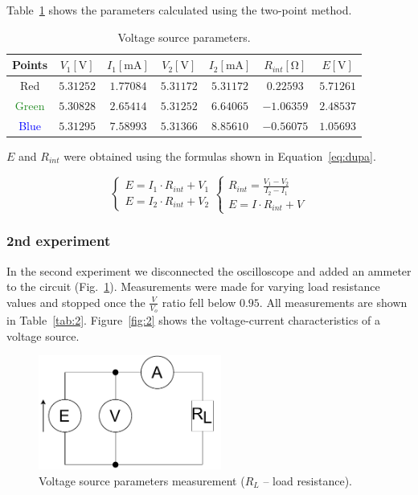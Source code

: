 Table~\ref{tab:voltage_2point} shows the parameters calculated using the two-point method.

\begin{table}[H]
	\centering
	\begin{tabular}{  c | c | c | c | c | c | c}
		Points & $V_1 [\unit{\volt}]$ & $I_1 [\unit{\milli\ampere}]$ & $V_2 [\unit{\volt}]$ & $I_2 [\unit{\milli\ampere}]$ & $R_{int} [\unit{\ohm}]$ & $E [\unit{\volt}]$ \\
		\hline
		\textcolor{BrickRed}{Red} & $5.31252$ & $1.77084$ & $5.31172$ & $5.31172$ & $0.22593$ & $5.71261$ \\
		\textcolor{ForestGreen}{Green} & $5.30828$ & $2.65414$ & $5.31252$ & $6.64065$ & $-1.06359$ & $2.48537$ \\
		\textcolor{blue}{Blue} & $5.31295$ & $7.58993$ & $5.31366$ & $8.85610$ & $-0.56075$ & $1.05693$ \\
	\end{tabular}
	\caption{Voltage source parameters.}
	\label{tab:voltage_2point}
\end{table}

$E$ and $R_{int}$ were obtained using the formulas shown in Equation~\ref{eq:dupa}.

\begin{equation}
	\begin{cases}
			E = I_1\cdot R_{int} + V_1\\
			E = I_2\cdot R_{int} + V_2
	\end{cases}
	\begin{cases}
		R_{int} = \frac{V_1-V_2}{I_2-I_1}\\
		E = I\cdot R_{int} + V
	\end{cases}
	\label{eq:dupa}
\end{equation}


\subsubsection*{2nd experiment}

In the second experiment we disconnected the oscilloscope and added an ammeter to the circuit (Fig.~\ref{fig:voltage}). Measurements were made for varying load resistance values and stopped once the $\frac{V}{V_o}$ ratio fell below $0.95$. All measurements are shown in Table~\ref{tab:2}. Figure~\ref{fig:2} shows the voltage-current characteristics of a voltage source. 

\begin{figure}[H]
	\centering
	\includegraphics[width=6cm]{schematics/2.pdf}
	\caption{Voltage source parameters measurement ($R_L$ -- load resistance).}
	\label{fig:voltage}
\end{figure}

